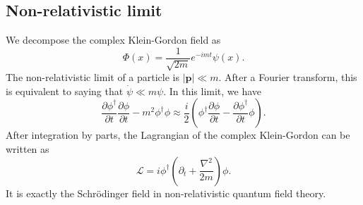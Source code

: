 \subsection{Non-relativistic limit}
We decompose the complex Klein-Gordon field as
\[\Phi(x) = \frac{1}{\sqrt{2m}} e^{-imt}\psi(x).\]
The non-relativistic limit of a particle is $|\bm{p}| \ll m$. After a Fourier transform, this is equivalent to saying that $\dot{\psi} \ll m\psi $. In this limit, we have
\[\frac{\partial \phi^{\dagger}}{\partial t} \frac{\partial \phi}{\partial t} - m^2 \phi^{\dagger}\phi \approx \frac{i}{2} \left( \phi^{\dagger}\frac{\partial \phi}{\partial t} - \frac{\partial \phi^{\dagger}}{\partial t} \phi\right).\]
After integration by parts, the Lagrangian of the complex Klein-Gordon can be written as
\[\mathcal{L} = i\phi^{\dagger}\left(\partial_t + \frac{\nabla^2}{2m} \right)\phi.\]
It is exactly the Schr\"{o}dinger field in non-relativistic quantum field theory.

